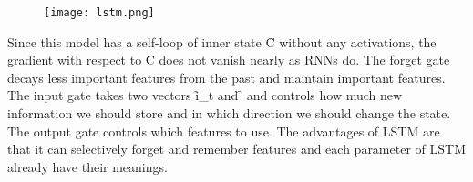 \begin{figure}[ht]
    \centering
    \texttt{[image: lstm.png]}
\end{figure}

Since this model has a self-loop of inner state \f{C} without any activations, the gradient with respect to \f{C} does not vanish nearly as RNNs do. The forget gate decays less important features from the past and maintain important features. The input gate takes two vectors \f{i_t} and \f{} and controls how much new information we should store and in which direction we should change the state. The output gate controls which features to use. The advantages of LSTM are that it can selectively forget and remember features and each parameter of LSTM already have their meanings.